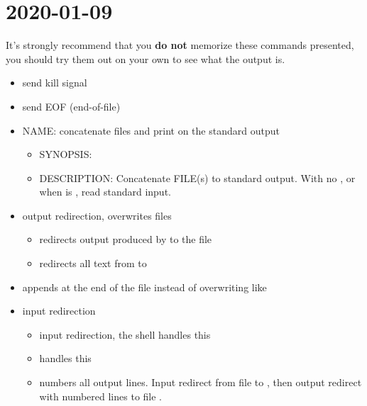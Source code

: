 \section{2020-01-09}
It's strongly recommend that you \textbf{do not} memorize these commands presented,
you should try them out on your own to see what the output is.

\begin{itemize}
    \item {} \textrightarrow{} send kill signal
    \item {} \textrightarrow{} send EOF (end-of-file)
    \item NAME\@:  \textrightarrow{} concatenate files and print on the standard output
          \begin{itemize}
              \item SYNOPSIS\@: 
              \item DESCRIPTION\@: Concatenate FILE(s) to standard output.
                    With no , or when  is \code{-}, read standard input.
          \end{itemize}
    \item \code{>} \textrightarrow{} output redirection, overwrites files
          \begin{itemize}
              \item {} \textrightarrow{} redirects output produced by
                     to the file 
              \item {} \textrightarrow{} redirects all text from
                     to 
          \end{itemize}
    \item \code{>{}>} \textrightarrow{} appends at the end of the file instead of overwriting like
          \code{>}
    \item \code{<} \textrightarrow{} input redirection
          \begin{itemize}
              \item {} \textrightarrow{}
                    input redirection, the shell handles this
              \item {} \textrightarrow{}
                     handles this
              \item {} \textrightarrow{}
                     numbers all output lines. Input redirect from file  to
                    , then output redirect with numbered lines to file .
          \end{itemize}
\end{itemize}

